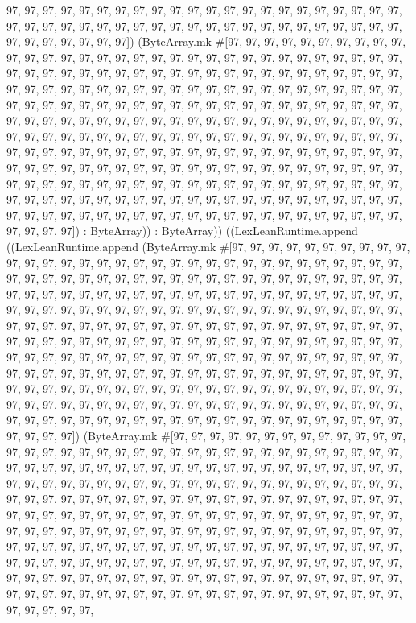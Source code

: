 \documentclass[11pt]{article}
\begin{document}
97, 97, 97, 97, 97, 97, 97, 97, 97, 97, 97, 97, 97, 97, 97, 97, 97, 97, 97, 97, 97, 97, 97, 97, 97, 97, 97, 97, 97, 97, 97, 97, 97, 97, 97, 97, 97, 97, 97, 97, 97, 97, 97, 97, 97, 97, 97, 97, 97, 97, 97]) (ByteArray.mk \#[97, 97, 97, 97, 97, 97, 97, 97, 97, 97, 97, 97, 97, 97, 97, 97, 97, 97, 97, 97, 97, 97, 97, 97, 97, 97, 97, 97, 97, 97, 97, 97, 97, 97, 97, 97, 97, 97, 97, 97, 97, 97, 97, 97, 97, 97, 97, 97, 97, 97, 97, 97, 97, 97, 97, 97, 97, 97, 97, 97, 97, 97, 97, 97, 97, 97, 97, 97, 97, 97, 97, 97, 97, 97, 97, 97, 97, 97, 97, 97, 97, 97, 97, 97, 97, 97, 97, 97, 97, 97, 97, 97, 97, 97, 97, 97, 97, 97, 97, 97, 97, 97, 97, 97, 97, 97, 97, 97, 97, 97, 97, 97, 97, 97, 97, 97, 97, 97, 97, 97, 97, 97, 97, 97, 97, 97, 97, 97, 97, 97, 97, 97, 97, 97, 97, 97, 97, 97, 97, 97, 97, 97, 97, 97, 97, 97, 97, 97, 97, 97, 97, 97, 97, 97, 97, 97, 97, 97, 97, 97, 97, 97, 97, 97, 97, 97, 97, 97, 97, 97, 97, 97, 97, 97, 97, 97, 97, 97, 97, 97, 97, 97, 97, 97, 97, 97, 97, 97, 97, 97, 97, 97, 97, 97, 97, 97, 97, 97, 97, 97, 97, 97, 97, 97, 97, 97, 97, 97, 97, 97, 97, 97, 97, 97, 97, 97, 97, 97, 97, 97, 97, 97, 97, 97, 97, 97, 97, 97, 97, 97, 97, 97, 97, 97, 97, 97, 97, 97, 97, 97, 97, 97, 97, 97, 97, 97, 97, 97, 97, 97, 97, 97, 97, 97, 97, 97]) : ByteArray)) : ByteArray)) ((LexLeanRuntime.append ((LexLeanRuntime.append (ByteArray.mk \#[97, 97, 97, 97, 97, 97, 97, 97, 97, 97, 97, 97, 97, 97, 97, 97, 97, 97, 97, 97, 97, 97, 97, 97, 97, 97, 97, 97, 97, 97, 97, 97, 97, 97, 97, 97, 97, 97, 97, 97, 97, 97, 97, 97, 97, 97, 97, 97, 97, 97, 97, 97, 97, 97, 97, 97, 97, 97, 97, 97, 97, 97, 97, 97, 97, 97, 97, 97, 97, 97, 97, 97, 97, 97, 97, 97, 97, 97, 97, 97, 97, 97, 97, 97, 97, 97, 97, 97, 97, 97, 97, 97, 97, 97, 97, 97, 97, 97, 97, 97, 97, 97, 97, 97, 97, 97, 97, 97, 97, 97, 97, 97, 97, 97, 97, 97, 97, 97, 97, 97, 97, 97, 97, 97, 97, 97, 97, 97, 97, 97, 97, 97, 97, 97, 97, 97, 97, 97, 97, 97, 97, 97, 97, 97, 97, 97, 97, 97, 97, 97, 97, 97, 97, 97, 97, 97, 97, 97, 97, 97, 97, 97, 97, 97, 97, 97, 97, 97, 97, 97, 97, 97, 97, 97, 97, 97, 97, 97, 97, 97, 97, 97, 97, 97, 97, 97, 97, 97, 97, 97, 97, 97, 97, 97, 97, 97, 97, 97, 97, 97, 97, 97, 97, 97, 97, 97, 97, 97, 97, 97, 97, 97, 97, 97, 97, 97, 97, 97, 97, 97, 97, 97, 97, 97, 97, 97, 97, 97, 97, 97, 97, 97, 97, 97, 97, 97, 97, 97, 97, 97, 97, 97, 97, 97, 97, 97, 97, 97, 97, 97, 97, 97, 97, 97, 97, 97]) (ByteArray.mk \#[97, 97, 97, 97, 97, 97, 97, 97, 97, 97, 97, 97, 97, 97, 97, 97, 97, 97, 97, 97, 97, 97, 97, 97, 97, 97, 97, 97, 97, 97, 97, 97, 97, 97, 97, 97, 97, 97, 97, 97, 97, 97, 97, 97, 97, 97, 97, 97, 97, 97, 97, 97, 97, 97, 97, 97, 97, 97, 97, 97, 97, 97, 97, 97, 97, 97, 97, 97, 97, 97, 97, 97, 97, 97, 97, 97, 97, 97, 97, 97, 97, 97, 97, 97, 97, 97, 97, 97, 97, 97, 97, 97, 97, 97, 97, 97, 97, 97, 97, 97, 97, 97, 97, 97, 97, 97, 97, 97, 97, 97, 97, 97, 97, 97, 97, 97, 97, 97, 97, 97, 97, 97, 97, 97, 97, 97, 97, 97, 97, 97, 97, 97, 97, 97, 97, 97, 97, 97, 97, 97, 97, 97, 97, 97, 97, 97, 97, 97, 97, 97, 97, 97, 97, 97, 97, 97, 97, 97, 97, 97, 97, 97, 97, 97, 97, 97, 97, 97, 97, 97, 97, 97, 97, 97, 97, 97, 97, 97, 97, 97, 97, 97, 97, 97, 97, 97, 97, 97, 97, 97, 97, 97, 97, 97, 97, 97, 97, 97, 97, 97, 97, 97, 97, 97, 97, 97, 97, 97, 97, 97, 97, 97, 97, 97, 97, 97, 97, 97, 97, 97, 97, 97, 97, 97, 97, 97, 97, 97, 97, 97, 97, 97, 97, 97, 97, 97, 97, 97, 
\end{document}
